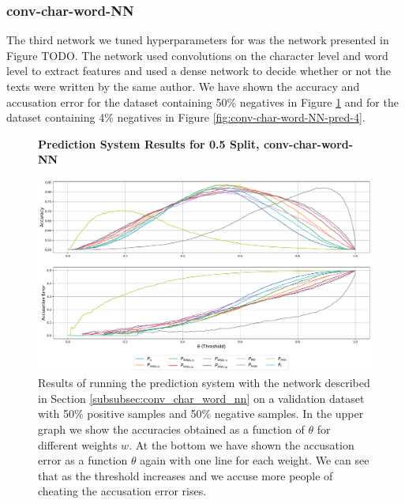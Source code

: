 \subsubsection{\glsdesc{conv-char-word-NN}}
\label{subsubsec:prediction_system_conv-char-word-NN}

The third network we tuned hyperparameters for was the network presented
in Figure TODO. The network used convolutions on the character level and
word level to extract features and used a dense network to decide whether or
not the texts were written by the same author. We have shown the accuracy
and accusation error for the dataset containing 50\% negatives in Figure
\ref{fig:conv-char-word-NN-pred-50} and for the dataset containing 4\%
negatives in Figure \ref{fig:conv-char-word-NN-pred-4}.

\begin{figure}
    \centering
    \textbf{Prediction System Results for 0.5 Split, \glsdesc{conv-char-word-NN}}\par\medskip
    \includegraphics[scale=0.33]{./pictures/experiments/conv_char_word_nn/prediction_system_50}
    \caption{Results of running the prediction system with the network described
        in Section \ref{subsubsec:conv_char_word_nn} on a validation dataset
        with 50\% positive samples and 50\% negative samples. In the upper graph
        we show the accuracies obtained as a function of $\theta$ for different
        weights $w$. At the bottom we have shown the accusation error as a
        function $\theta$ again with one line for each weight. We can see that
        as the threshold increases and we accuse more people of cheating the
        accusation error rises.}
    \label{fig:conv-char-word-NN-pred-50}
\end{figure}

